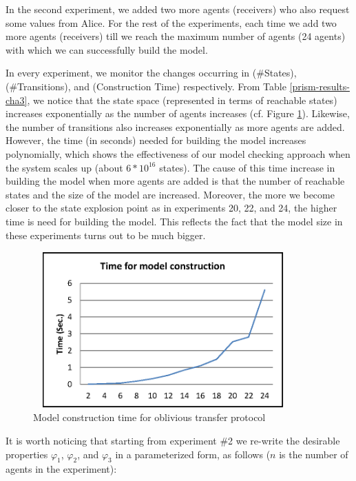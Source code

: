 In the second experiment, we added two more agents
(receivers) who also request some values from Alice. For the rest
of the experiments, each time we add two more agents (receivers)
till we reach the maximum number of agents (24 agents) with which
we can successfully build the model.

In every experiment, we monitor the changes occurring in
(\#States), (\#Transitions), and (Construction Time) respectively.
From Table \ref{prism-results-cha3}, we notice that the state space
(represented in terms of reachable states) increases exponentially
as the number of agents increases (cf. Figure
\ref{fig:Obliviou-simulation}). Likewise, the number of
transitions also increases exponentially as more agents are added.
However, the time (in seconds) needed for building the model
increases polynomially, which shows the effectiveness of our model
checking approach when the system scales up (about $6*10^{16}$
states). The cause of this time increase in building the model
when more agents are added is that the number of reachable states
and the size of the model are increased. Moreover, the more we
become closer to the state explosion point as in experiments 20,
22, and 24, the higher time is need for building the model. This
reflects the fact that the model size in these experiments turns
out to be much bigger.

\begin{figure}%
\begin{center}
\includegraphics [width=10cm, height=6cm]{chap3/img/model-time.eps}
  \caption{Model construction time for oblivious transfer protocol}
\label{fig:Obliviou-simulation}
\end{center}
\end{figure}



It is worth noticing that starting from experiment \#2 we re-write
the desirable properties $\varphi_1$, $\varphi_2$, and $\varphi_3$
in a parameterized form, as follows ($n$ is the number of agents
in the experiment):

